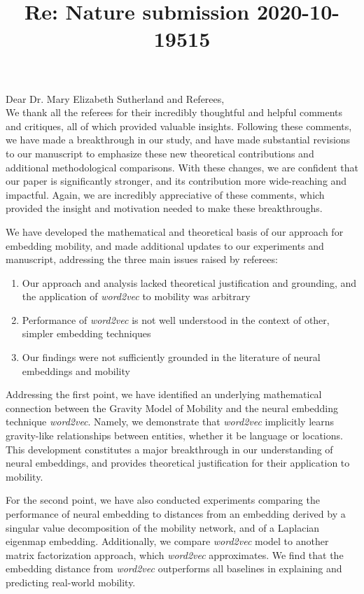 \documentclass[12pt,a4paper]{article}
\title{Re: Nature submission 2020-10-19515}
\date{}
\makeatletter
\renewcommand{\maketitle}{\bgroup\setlength{\parindent}{0pt}
\begin{flushleft}
\Large  \textbf{\@title}
\end{flushleft}\egroup
}
\makeatother
\begin{document}
\maketitle

\bigskip
\noindent Dear Dr. Mary Elizabeth Sutherland and Referees, \\ 

We thank all the referees for their incredibly thoughtful and helpful comments and critiques, all of which provided valuable insights. 
Following these comments, we have made a breakthrough in our study, and have made substantial revisions to our manuscript to emphasize these new theoretical contributions and additional methodological comparisons. 
With these changes, we are confident that our paper is significantly stronger, and its contribution more wide-reaching and impactful. 
Again, we are incredibly appreciative of these comments, which provided the insight and motivation needed to make these breakthroughs. 

We have developed the mathematical and theoretical basis of our approach for embedding mobility, and made additional updates to our experiments and manuscript, addressing the three main issues raised by referees:

\begin{enumerate}
    \itemsep0em 
	\item Our approach and analysis lacked theoretical justification and grounding, and the application of \textit{word2vec} to mobility was arbitrary
	\item Performance of \textit{word2vec} is not well understood in the context of other, simpler embedding techniques
	\item Our findings were not sufficiently grounded in the literature of neural embeddings and mobility
\end{enumerate}

Addressing the first point, we have identified an underlying mathematical connection between the Gravity Model of Mobility and the neural embedding technique \textit{word2vec}. 
Namely, we demonstrate that \textit{word2vec} implicitly learns gravity-like relationships between entities, whether it be language or locations. 
This development constitutes a major breakthrough in our understanding of neural embeddings, and provides theoretical justification for their application to mobility. 

For the second point, we have also conducted experiments comparing the performance of neural embedding to distances from an embedding derived by a singular value decomposition of the mobility network, and of a Laplacian eigenmap embedding. Additionally, we compare \textit{word2vec} model to another matrix factorization approach, which \textit{word2vec} approximates. We find that the embedding distance from \textit{word2vec} outperforms all baselines in explaining and predicting real-world mobility. 
\end{document}
